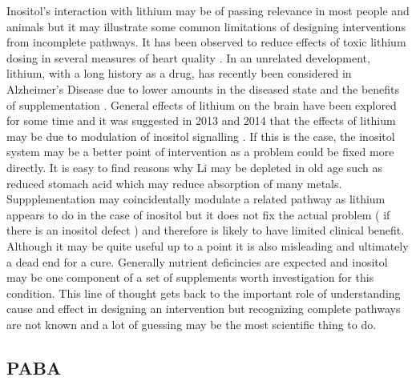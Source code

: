 Inositol's interaction with lithium may be of passing
relevance in  most people and animals but it may illustrate
some common limitations of designing interventions from 
incomplete pathways. 
It has been observed to reduce effects of toxic lithium dosing
in several measures of heart quality \cite{LABBATE2024117287}.
In an unrelated development, 
lithium, with a long history as a drug, has recently 
been considered in Alzheimer's Disease 
due to lower amounts in the diseased state and 
the benefits of supplementation \cite{PMC12443616}. 
General effects of lithium on the brain have been explored
for some time and it was suggested in 2013 and 2014 that the 
effects of lithium may be due to
modulation of inositol signalling 
\cite{Toker_Bersudsky_Plaschkes_Inositol_Related_Gene_Knockouts_2014}
\cite{doi:10.1021/cn5001149}. If this is the case, the inositol system  
may be  a better point of intervention  as a  
problem could be fixed more directly. 
It is easy to find reasons why Li may be depleted in old age such
as reduced stomach acid which may reduce absorption of many metals. 
Suppplementation may coincidentally modulate a related
pathway as lithium appears to do in the case of inositol but it
does not fix the actual problem ( if there is an inositol defect )
 and therefore is likely to have limited
clinical benefit. Although it may be quite useful up to a point
 it is also misleading and ultimately a dead end for a cure. 
Generally nutrient deficincies are expected 
\cite{marchywka-MJM-2023-008-0.30rg}
and inositol may be one component of a  
set of supplements  worth investigation for this condition. 
This line of thought  gets back to the important role of understanding
cause and effect in designing an intervention but recognizing 
complete pathways are not known and a lot of guessing may be the most
scientific thing to do. 

\subsection{PABA}

